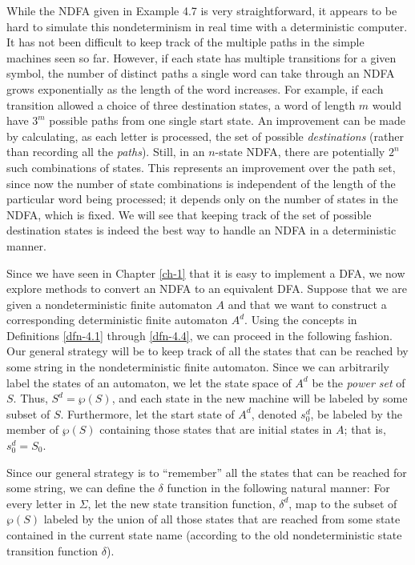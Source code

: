 While the NDFA given in Example 4.7 is very straightforward, it appears to be
hard to simulate this nondeterminism in real time with a deterministic computer.
It has not been difficult to keep track of the multiple paths in the simple
machines seen so far. However, if each state has multiple transitions for a
given symbol, the number of distinct paths a single word can take through an
NDFA grows exponentially as the length of the word increases. For example, if
each transition allowed a choice of three destination states, a word of length
$m$ would have $3^m$ possible paths from one single start state. An improvement
can be made by calculating, as each letter is processed, the set of possible
\emph{destinations} (rather than recording all the \emph{paths}). Still, in an
$n$-state NDFA, there are potentially $2^n$ such combinations of states. This
represents an improvement over the path set, since now the number of state
combinations is independent of the length of the particular word being
processed; it depends only on the number of states in the NDFA, which is
fixed. We will see that keeping track of the set of possible destination states
is indeed the best way to handle an NDFA in a deterministic manner.

Since we have seen in Chapter \ref{ch-1} that it is easy to implement a DFA, we now
explore methods to convert an NDFA to an equivalent DFA. Suppose that we are
given a nondeterministic finite automaton $A$ and that we want to construct a
corresponding deterministic finite automaton $A^d$. Using the concepts in
Definitions \ref{dfn-4.1} through \ref{dfn-4.4}, we can proceed in the following fashion. Our
general strategy will be to keep track of all the states that can be reached by
some string in the nondeterministic finite automaton. Since we can arbitrarily
label the states of an automaton, we let the state space of $A^d$ be the
\emph{power set} of $S$. Thus, $S^d = \wp(S)$, and each state in the new
machine will be labeled by some subset of $S$. Furthermore, let the start state
of $A^d$, denoted $s^d_0$, be labeled by the member of $\wp(S)$ containing
those states that are initial states in $A$; that is, $s^d_0 = S_0$.

Since our general strategy is to ``remember'' all the states that can be reached
for some string, we can define the $\delta$ function in the following natural
manner: For every letter in $\Sigma$, let the new state transition function,
$\delta^d$, map to the subset of $\wp(S)$ labeled by the union of all those
states that are reached from some state contained in the current state name
(according to the old nondeterministic state transition function $\delta$).

